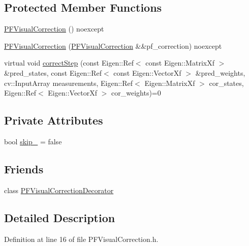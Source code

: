 \subsection*{Protected Member Functions}
\begin{DoxyCompactItemize}
\item 
\mbox{\hyperlink{classbfl_1_1PFVisualCorrection_ae345f5daf39cbae54f4c6890c681d0b5}{P\+F\+Visual\+Correction}} () noexcept
\item 
\mbox{\hyperlink{classbfl_1_1PFVisualCorrection_ab20c769ebe03ff70324df73cb194e2db}{P\+F\+Visual\+Correction}} (\mbox{\hyperlink{classbfl_1_1PFVisualCorrection}{P\+F\+Visual\+Correction}} \&\&pf\+\_\+correction) noexcept
\item 
virtual void \mbox{\hyperlink{classbfl_1_1PFVisualCorrection_a44a0ad575d02b89d5571b15ce585cf8f}{correct\+Step}} (const Eigen\+::\+Ref$<$ const Eigen\+::\+Matrix\+Xf $>$ \&pred\+\_\+states, const Eigen\+::\+Ref$<$ const Eigen\+::\+Vector\+Xf $>$ \&pred\+\_\+weights, cv\+::\+Input\+Array measurements, Eigen\+::\+Ref$<$ Eigen\+::\+Matrix\+Xf $>$ cor\+\_\+states, Eigen\+::\+Ref$<$ Eigen\+::\+Vector\+Xf $>$ cor\+\_\+weights)=0
\end{DoxyCompactItemize}
\subsection*{Private Attributes}
\begin{DoxyCompactItemize}
\item 
bool \mbox{\hyperlink{classbfl_1_1PFVisualCorrection_ad0b76bc0a2506bf02f56d393ab09b2a4}{skip\+\_\+}} = false
\end{DoxyCompactItemize}
\subsection*{Friends}
\begin{DoxyCompactItemize}
\item 
class \mbox{\hyperlink{classbfl_1_1PFVisualCorrection_a4d2412d32e038a7e3df6ffe3aca5896e}{P\+F\+Visual\+Correction\+Decorator}}
\end{DoxyCompactItemize}


\subsection{Detailed Description}


Definition at line 16 of file P\+F\+Visual\+Correction.\+h.



